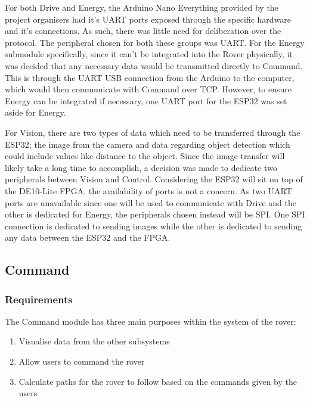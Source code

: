 \documentclass[a4paper]{article}
\begin{document}
For both Drive and Energy, the Arduino Nano Everything provided by the 
project organisers had it’s UART ports exposed through the specific 
hardware and it’s connections. As such, there was little need for 
deliberation over the protocol. The peripheral chosen for both these 
groups was UART. For the Energy submodule specifically, since it can’t 
be integrated into the Rover physically, it was decided that any necessary 
data would be transmitted directly to Command. This is through the UART 
USB connection from the Arduino to the computer, which would then 
communicate with Command over TCP. However, to ensure Energy can be 
integrated if necessary, one UART port for the ESP32 was set aside for 
Energy.

For Vision, there are two types of data which need to be transferred 
through the ESP32; the image from the camera and data regarding object 
detection which could include values like distance to the object. Since 
the image transfer will likely take a long time to accomplish, a decision
was made to dedicate two peripherals between Vision and Control. 
Considering the ESP32 will sit on top of the DE10-Lite FPGA, the 
availability of ports is not a concern. As two UART ports are unavailable 
since one will be used to communicate with Drive and the other is 
dedicated for Energy, the peripherals chosen instead will be SPI. 
One SPI connection is dedicated to sending images while the other is 
dedicated to sending any data between the ESP32 and the FPGA.

\subsection{Command}

\subsubsection{Requirements}

The Command module has three main purposes within the system of the rover:

\begin{enumerate}
    \item Visualise data from the other subsystems
    \item Allow users to command the rover
    \item Calculate paths for the rover to follow based on the commands given by the users
\end{enumerate}
\end{document}
